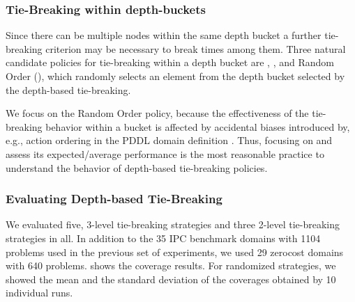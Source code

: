 \subsubsection{Tie-Breaking within depth-buckets} %
Since there can be multiple nodes within the same depth bucket
a further tie-breaking criterion may be necessary to break times among them.
Three natural candidate policies for tie-breaking within a depth bucket are
\fifo, \lifo, and Random Order (\ro), which
randomly selects an element from the depth bucket selected by the depth-based tie-breaking.

We focus on the Random Order policy,
because the effectiveness of the tie-breaking behavior within a bucket
is affected by accidental biases introduced by, e.g.,  action ordering in the PDDL domain
definition \cite{vallati2015effective}.
Thus, focusing on \ro and assess its expected/average
performance is the most reasonable practice to understand the behavior of 
depth-based tie-breaking policies.



\subsubsection{Evaluating Depth-based Tie-Breaking}

We evaluated five, 3-level tie-breaking strategies and three 2-level
tie-breaking strategies in all.
% 
In addition to the 35 IPC benchmark domains with 1104 problems used in
the previous set of experiments, we used 29 zerocost domains with 640
problems.   shows the coverage results. For randomized strategies, we
showed the mean and the standard deviation of the coverages obtained by
10 individual runs.

